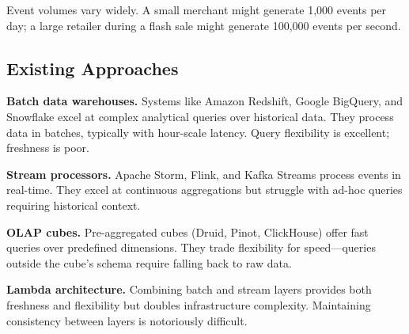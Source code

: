 Event volumes vary widely. A small merchant might generate 1,000 events per day; a large retailer during a flash sale might generate 100,000 events per second.

\subsection{Existing Approaches}

\textbf{Batch data warehouses.} Systems like Amazon Redshift, Google BigQuery, and Snowflake excel at complex analytical queries over historical data. They process data in batches, typically with hour-scale latency. Query flexibility is excellent; freshness is poor.

\textbf{Stream processors.} Apache Storm, Flink, and Kafka Streams process events in real-time. They excel at continuous aggregations but struggle with ad-hoc queries requiring historical context.

\textbf{OLAP cubes.} Pre-aggregated cubes (Druid, Pinot, ClickHouse) offer fast queries over predefined dimensions. They trade flexibility for speed—queries outside the cube's schema require falling back to raw data.

\textbf{Lambda architecture.} Combining batch and stream layers provides both freshness and flexibility but doubles infrastructure complexity. Maintaining consistency between layers is notoriously difficult.

